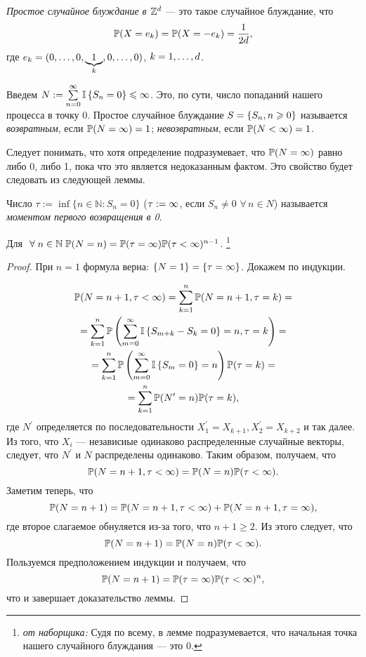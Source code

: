 \begin{df}
	\textit{Простое случайное блуждание в $\mathbb{Z}^d$} --- это такое случайное блуждание, что
	$$
		\mathbb{P}(X = e_k) = \mathbb{P}(X = -e_k) = \frac1{2d},
	$$
	где $e_k = (0 ,\ldots, 0, \underbrace{1}_k, 0 ,\ldots, 0)$, $k = 1 ,\ldots, d$.
\end{df}

\begin{df}
	Введем $N := \sum\limits_{n=0}^{\infty} \mathbb{I} \left\{S_n = 0\right\} \leqslant \infty$.
	Это, по сути, число попаданий нашего процесса в точку $0$.
	Простое случайное блуждание $S = \left\{S_n, n \geqslant 0\right\}$ называется \textit{возвратным},
	если $\mathbb{P}(N = \infty) = 1$; \textit{невозвратным}, если $\mathbb{P}(N < \infty) = 1$.
\end{df}

\begin{note}
	Следует понимать, что хотя определение подразумевает, что $\mathbb{P}(N = \infty)$ равно либо 0, либо 1,
	пока что это является недоказанным фактом.
	Это свойство будет следовать из следующей леммы.
\end{note}
\begin{df}
	Число $\tau := \inf\lbrace n \in \mathbb{N} : S_{n} = 0 \rbrace$ ($\tau := \infty$, если $S_{n} \neq 0$ $\forall\, n \in N$) называется \emph{моментом первого возвращения в 0}.
\end{df}

\begin{lemma}
	Для	$ ~\forall\; n \in \mathbb{N} \; \mathbb{P}(N = n)	=	\mathbb{P}(\tau = \infty)\mathbb{P}(\tau < \infty)^{n-1}$.
		\footnote{\textit{от наборщика:} Судя по всему, в лемме подразумевается,
			что начальная точка нашего случайного блуждания --- это 0.}
\end{lemma}

\begin{proof}
	При $n = 1$ формула верна: $\left\{ N = 1\right\} = \left\{ \tau = \infty\right\}$.
Докажем по индукции.

	\begin{gather*}
		\mathbb{P}(N = n+1, \tau < \infty) =
		\sum\limits_{k=1}^{n} \mathbb{P}(N = n+1, \tau = k) = \\
	=	\sum\limits_{k=1}^{n} \mathbb{P}\left( \sum_{m=0}^{\infty} \mathbb{I} \left\{ S_{m+k} - S_k = 0 \right\} = n, \tau = k\right) = \\
	=	\sum\limits_{k=1}^{n} \mathbb{P} \left( \sum_{m=0}^{\infty} \mathbb{I} \left\{ S_m = 0\right\} = n\right) \mathbb{P}(\tau = k) = \\
	=	\sum\limits_{k=1}^{n} \mathbb{P}(N^{\prime} = n)\mathbb{P}(\tau = k),
	\end{gather*}
	где $N^{\prime}$ определяется по последовательности
	$X_1^{\prime} = X_{k+1}, X_{2}^{\prime} = X_{k+2}$ и так далее.
	Из того, что $X_i$ --- независиые одинаково распределенные случайные векторы,
	следует, что $N^{\prime}$ и $N$ распределены одинаково.
	Таким образом, получаем, что
	$$
		\mathbb{P}(N = n+1, \tau < \infty) = \mathbb{P}(N = n)\mathbb{P}(\tau < \infty).
	$$
	Заметим теперь, что
	$$
		\mathbb{P}(N = n+1) = \mathbb{P}(N = n+1, \tau < \infty) + \mathbb{P}(N = n+1, \tau = \infty),
	$$
	где второе слагаемое обнуляется из-за того, что $n+1 \ge 2$.
	Из этого следует, что
	$$
		\mathbb{P}(N = n+1) = \mathbb{P}(N = n)\mathbb{P}(\tau < \infty).
	$$
		Пользуемся предположением индукции и получаем, что
	$$
		\mathbb{P}(N = n+1) = \mathbb{P}(\tau = \infty)\mathbb{P}(\tau < \infty)^n,
	$$
	что и завершает доказательство леммы.
\end{proof}

